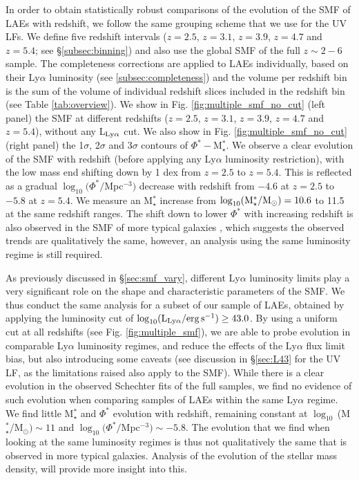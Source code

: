 \documentclass[a4paper,fleqn,usenatbib]{mnras}
\begin{document}
In order to obtain statistically robust comparisons of the evolution of the SMF of LAEs with redshift, we follow the same grouping scheme that we use for the UV LFs. We define five redshift intervals ($z=2.5$, $z=3.1$, $z=3.9$, $z=4.7$ and $z=5.4$; see \S\ref{subsec:binning}) and also use the global SMF of the full $z\sim2-6$ sample. The completeness corrections are applied to LAEs individually, based on their Ly$\alpha$ luminosity (see \ref{subsec:completeness}) and the volume per redshift bin is the sum of the volume of individual redshift slices included in the redshift bin (see Table \ref{tab:overview}). We show in Fig. \ref{fig:multiple_smf_no_cut} (left panel) the SMF at different redshifts ($z=2.5$, $z=3.1$, $z=3.9$, $z=4.7$ and $z=5.4$), without any L$_{\rm Ly\alpha}$ cut. We also show in Fig. \ref{fig:multiple_smf_no_cut} (right panel) the 1$\sigma$, 2$\sigma$ and 3$\sigma$ contours of $\Phi^*-$M$_\star^*$. We observe a clear evolution of the SMF with redshift (before applying any Ly$\alpha$ luminosity restriction), with the low mass end shifting down by 1 dex from $z=2.5$ to $z=5.4$. This is reflected as a gradual $\log_{10}(\Phi^*/$Mpc$^{-3})$ decrease with redshift from $-4.6$ at $z=2.5$ to $-5.8$ at $z=5.4$. We measure an M$_\star^*$ increase from $\log_{10}(\rm M_\star^*/M_\odot)=10.6$ to 11.5 at the same redshift ranges. The shift down to lower $\Phi^*$ with increasing redshift is also observed in the SMF of more typical galaxies \citep[e.g.][]{Muzzin2013}, which suggests the observed trends are qualitatively the same, however, an analysis using the same luminosity regime is still required.

As previously discussed in \S\ref{sec:smf_vary}, different Ly$\alpha$ luminosity limits play a very significant role on the shape and characteristic parameters of the SMF. We thus conduct the same analysis for a subset of our sample of LAEs, obtained by applying the luminosity cut of $\log_{10} (\rm L_{Ly\alpha}/erg\,s^{-1}) \geq 43.0$. By using a uniform cut at all redshifts (see Fig. \ref{fig:multiple_smf}), we are able to probe evolution in comparable Ly$\alpha$ luminosity regimes, and reduce the effects of the Ly$\alpha$ flux limit bias, but also introducing some caveats (see discussion in \S\ref{sec:L43} for the UV LF, as the limitations raised also apply to the SMF). While there is a clear evolution in the observed Schechter fits of the full samples, we find no evidence of such evolution when comparing samples of LAEs within the same Ly$\alpha$ regime. We find little M$_\star^*$ and $\Phi^*$ evolution with redshift, remaining constant at $\log_{10}\,$(M$_\star^*$/M$_{\odot})\sim11$ and $\log_{10}(\Phi^*/$Mpc$^{-3})\sim-5.8$. The evolution that we find when looking at the same luminosity regimes is thus not qualitatively the same that is observed in more typical galaxies. Analysis of the evolution of the stellar mass density, will provide more insight into this.
\end{document}
